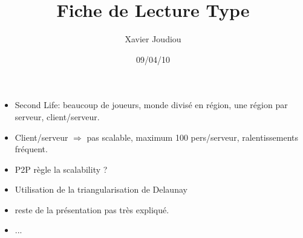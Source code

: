 \documentclass[11pt,a4paper]{article}
\title{Fiche de Lecture Type}
\author{Xavier Joudiou}
\date{09/04/10}
\begin{document}
	
  \begin{itemize}
  \renewcommand{\labelitemi}{$\Rightarrow$}
	\item Second Life: beaucoup de joueurs, monde divisé en région, une région par serveur, client/serveur.
	\item Client/serveur $\Rightarrow$ pas scalable, maximum 100 pers/serveur, ralentissements fréquent.
	\item P2P règle la scalability ?
	\item Utilisation de la triangularisation de Delaunay
	\item reste de la présentation pas très expliqué.
	\item ...
  \end{itemize}
\end{document}
